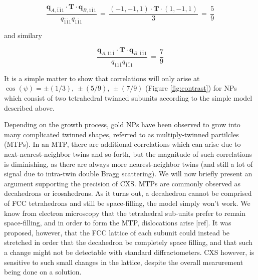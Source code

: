 \documentclass [11pt,fleqn]{article}
\def \be {\begin{equation}}
\def \ee {\end{equation}}
\begin{document}
\be
\frac{ \bm q_{A,\bar{1}\bar{1}1} \cdot \mathbf T \cdot \bm q_{B,1\bar{1}1}} {{q_{\bar 1 \bar 1 1} q_{1\bar{1}1} }} \,=\, \frac { ( −1,-1,1 ) \cdot \mathbf T \cdot ( 1,-1,1 ) } {3} \,=\, \frac{5}{9}
\ee

and similary

\be
\frac{ \bm q_{A,11 \bar{1}} \cdot \bm T \cdot \bm q_{B,\bar{1}\bar{1}1}} { { q_{11\bar 1}  q_{ \bar 1 \bar 1 1} } } \,=\, \frac{7}{9}
\ee

It is a simple matter to show that correlations will only arise at $\cos (\psi) = \pm(1/3),\, \pm (5/9),\,  \pm (7/9)$ (Figure \ref{fig:contrast}) for NPs which consist of two tetrahedral twinned subunits according to the simple model described above.

Depending on the growth process, gold NPs have been observed to grow into many complicated twinned shapes, referred to as multiply-twinned partilcles (MTPs). In an MTP, there are additional correlations which can arise due to next-nearest-neighbor twins and so-forth, but the magnitude of such correlations is diminishing, as there are always more nearest-neighbor twins (and still a lot of signal due to intra-twin double Bragg scattering). We will now briefly present an argument supporting the precision of CXS. MTPs are commonly observed as decahedrons or icosahedrons. As it turns out, a decahedron cannot be comprised of FCC tetrahedrons and still be space-filling, the model simply won't work. We know from electron microscopy that the tetrahedral sub-units prefer to remain space-filling, and in order to form the MTP, dislocations arise [ref]. It was proposed, however, that the FCC lattice of each subunit could instead be stretched in order that the decahedron be completely space filling, and that such a change might not be detectable with standard diffractometers. CXS however, is sensitive to such small changes in the lattice, despite the overall mearurement being done on a solution.
\end{document}
